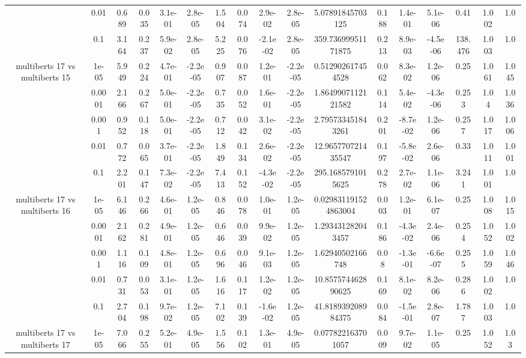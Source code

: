 \begin{tabular}{|c|c|c|c|c|c|c|c|c|c|c|c|c|c|c|c|c|}
 & 0.01 & 0.689 & 0.035 & 3.1e-01 & 2.8e-05 & 1.504 & 0.074 & 2.9e-02 & 2.8e-05 & 5.07891845703125 & 0.188 & 1.4e-01 & 5.1e-06 & 0.41 & 1.002 & 1.0 \\
 & 0.1 & 3.164 & 0.237 & 5.9e-02 & 2.8e-05 & 5.225 & 0.076 & -2.1e-02 & 2.8e-05 & 359.73699951171875 & 0.213 & 8.9e-03 & -4.5e-06 & 138.476 & 1.003 & 1.0 \\
\hline
\multirow{5}{*}{multiberts 17 vs multiberts 15} & 1e-05 & 5.949 & 0.224 & 4.7e-01 & -2.2e-05 & 0.907 & 0.087 & 1.2e-01 & -2.2e-05 & 0.512902617454528 & 0.062 & 8.3e-02 & 1.2e-06 & 0.25 & 1.061 & 1.045 \\
 & 0.0001 & 2.166 & 0.267 & 5.0e-01 & -2.2e-05 & 0.735 & 0.052 & 1.6e-01 & -2.2e-05 & 1.8649907112121582 & 0.114 & 5.4e-02 & -4.3e-06 & 0.253 & 1.04 & 1.036 \\
 & 0.001 & 0.952 & 0.118 & 5.0e-01 & -2.2e-05 & 0.712 & 0.042 & 3.1e-02 & -2.2e-05 & 2.795733451843261 & 0.201 & -8.7e-02 & 1.2e-06 & 0.257 & 1.017 & 1.006 \\
 & 0.01 & 0.772 & 0.065 & 3.7e-01 & -2.2e-05 & 1.849 & 0.134 & 2.6e-02 & -2.2e-05 & 12.965770721435547 & 0.197 & -5.8e-02 & 2.6e-06 & 0.33 & 1.011 & 1.001 \\
 & 0.1 & 2.201 & 0.147 & 7.3e-02 & -2.2e-05 & 7.413 & 0.152 & -4.3e-02 & -2.2e-05 & 295.1685791015625 & 0.278 & 2.7e-02 & 1.1e-06 & 3.241 & 1.001 & 1.0 \\
\hline
\multirow{5}{*}{multiberts 17 vs multiberts 16} & 1e-05 & 6.146 & 0.266 & 4.6e-01 & 1.2e-05 & 0.846 & 0.078 & 1.0e-01 & 1.2e-05 & 0.029831191524863004 & 0.003 & 1.2e-01 & 6.1e-07 & 0.25 & 1.008 & 1.015 \\
 & 0.0001 & 2.162 & 0.281 & 4.9e-01 & 1.2e-05 & 0.646 & 0.039 & 9.9e-02 & 1.2e-05 & 1.293431282043457 & 0.186 & -4.3e-02 & 2.4e-06 & 0.254 & 1.052 & 1.002 \\
 & 0.001 & 1.116 & 0.109 & 4.8e-01 & 1.2e-05 & 0.696 & 0.046 & 9.1e-03 & 1.2e-05 & 1.62940502166748 & 0.08 & -1.3e-01 & -6.6e-07 & 0.255 & 1.059 & 1.046 \\
 & 0.01 & 0.731 & 0.053 & 3.1e-01 & 1.2e-05 & 1.616 & 0.117 & 1.2e-02 & 1.2e-05 & 10.857574462890625 & 0.169 & 8.1e-02 & 8.2e-06 & 0.286 & 1.002 & 1.0 \\
 & 0.1 & 2.704 & 0.198 & 9.7e-02 & 1.2e-05 & 7.102 & 0.139 & -1.6e-02 & 1.2e-05 & 41.818939208984375 & 0.084 & -1.5e-01 & 2.8e-07 & 1.787 & 1.003 & 1.0 \\
\hline
\multirow{5}{*}{multiberts 17 vs multiberts 17} & 1e-05 & 7.066 & 0.255 & 5.2e-01 & 4.9e-05 & 1.556 & 0.102 & 1.3e-01 & 4.9e-05 & 0.077822163701057 & 0.009 & 9.7e-02 & 1.1e-05 & 0.25 & 1.052 & 1.03 \\

\end{tabular}
